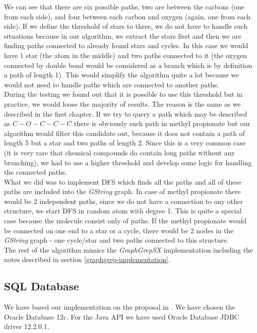 {We can see that there are six possible paths, two are between the carbons (one from each side), and four between each carbon and oxygen (again, one from each side). If we define the threshold of stars to three, we do not have to handle such situations because in our algorithm, we extract the stars first and then we are finding paths connected to already found stars and cycles. In this case we would have 1 star (the atom in the middle) and two paths connected to it (the oxygen connected by double bond would be considered as a branch which is by definition a path of length 1). This would simplify the algorithm quite a lot because we would not need to handle paths which are connected to another paths.\\

During the testing we found out that it is possible to use this threshold but in practice, we would loose the majority of results. The reason is the same as we described in the first chapter. If we try to query a path which may be described as $C-O-C-C-C$ there is obviously such path in methyl propionate but our algorithm would filter this candidate out, because it does not contain a path of length 5 but a star and two paths of length 2. Since this is a very common case (it is very rare that chemical compounds do contain long paths without any branching), we had to use a higher threshold and develop some logic for handling the connected paths.\\

What we did was to implement DFS which finds all the paths and all of these paths are included into the \textit{GString} graph. In case of methyl propionate there would be 2 independent paths, since we do not have a connection to any other structure, we start DFS in random atom with degree 1. This is quite a special case because the molecule consist only of paths. If the methyl propionate would be connected on one end to a star or a cycle, there would be 2 nodes in the \textit{GString} graph - one cycle/star and two paths connected to this structure.\\

The rest of the algorithm mimics the \textit{GraphGrepSX} implementation including the notes described in section \ref{graphgrep-implementation}.

\subsection{SQL Database}

We have based our implementation on the proposal in \cite{SQL}. We have chosen the Oracle Database 12c. For the Java API we have used Oracle Database JDBC driver 12.2.0.1.\\

}
